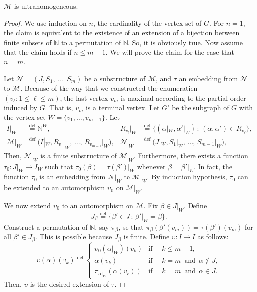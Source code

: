 \documentclass[AHL,Unicode,longabstracts,published]{cedram}
\newcommand*{\defeq}{\stackrel{\mathrm{def}}{=}}
\newcommand*\N{\mathbb{N}}
\newcommand*\NN{\mathcal{N}}
\newcommand*\MM{\mathcal{M}}
\newcommand*\M{\MM}
\newcommand*\N{\mathbb{N}}
\begin{document}
\begin{lemm}\label{lem: ultrahomogeneity}
$\M$ is ultrahomogeneous.
\end{lemm}
\begin{proof}
We use induction on $n$, the cardinality of the vertex set of $G$. For $n=1$, the claim is equivalent to the existence of an extension of a bijection between finite subsets of $\N$ to a permutation of $\N$. So, it is obviously true. Now assume that the claim holds if $n\leq m-1$. We will prove the claim for the case that $n = m$.

Let $\NN = (J,S_1,\,\ldots,\,S_m)$ be a substructure of $\MM$, and $\tau$ an embedding from $\NN$ to $\MM$. Because of the way that we constructed the enumeration $(v_\ell : 1\leq \ell \leq m)$, the last vertex $v_m$ is maximal according to the partial order induced by $G$. That is, $v_m$ is a terminal vertex. Let $G'$ be the subgraph of $G$ with the vertex set $W=\{v_1,\ldots,v_{m-1}\}$. Let
\begin{align*}
I|_W &
\defeq \N^{W}, & R_{v_\ell}|_W &
\defeq \big\{(\alpha|_W,\alpha'|_W)\,:\,(\alpha,\alpha') \in R_{v_\ell}\big\},
\\
\MM|_{W} &
\defeq \big(I|_W,R_{v_1}|_W,\,\ldots,\,R_{v_{m-1}}|_W\big), &
\NN|_{W} &
\defeq \big(J|_W,S_1|_W,\,\ldots,\,S_{m-1}|_W\big),
\end{align*}
Then, $\NN|_W$ is a finite substructure of $\MM|_W$. Furthermore, there exists a function $\tau_0 : J|_W \to I_W$ such that $\tau_0(\beta)=\tau(\beta')|_W$ whenever $\beta = \beta'|_W$. In fact, the function $\tau_0$ is an embedding from $\NN|_W$ to $\MM|_W$. By induction hypothesis, $\tau_0$ can be extended to an automorphism $\upsilon_0$ on $\MM|_W$.

We now extend $\upsilon_0$ to an automorphism on $\MM$. Fix $\beta \in J|_W$. Define
\[
J_\beta
\defeq \{\beta' \in J\,:\,\beta'|_{W}=\beta\}.
\]
Construct a permutation of $\N$, say $\pi_\beta$, so that $\pi_\beta(\beta'(v_m))=\tau(\beta')(v_m)$ for all $\beta' \in J_\beta$. This is possible because $J_\beta$ is finite. Define $\upsilon : I \to I$ as follows:
\[
\upsilon(\alpha)(v_k)
\defeq
\begin{cases}
\upsilon_0(\alpha|_W)(v_k) & \text{if }\quad k \leq m-1,
\\
\alpha(v_k) & \text{if }\quad k = m\, \text{ and }\, \alpha \notin J,
\\
\pi_{\alpha|_W}(\alpha(v_k)) & \text{if }\quad k = m\, \text{ and }\, \alpha \in J.
\end{cases}
\]
Then, $\upsilon$ is the desired extension of $\tau$.
\end{proof}
\end{document}
